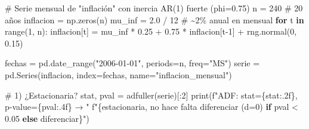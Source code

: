 \documentclass[
  spanish,
  letterpaper,
  DIV=11,
  numbers=noendperiod]{scrreprt}
\newenvironment{Shaded}{\begin{snugshade}}{\end{snugshade}}
\newcommand{\BuiltInTok}[1]{\textcolor[rgb]{0.00,0.23,0.31}{#1}}
\newcommand{\CommentTok}[1]{\textcolor[rgb]{0.37,0.37,0.37}{#1}}
\newcommand{\ControlFlowTok}[1]{\textcolor[rgb]{0.00,0.23,0.31}{\textbf{#1}}}
\newcommand{\DecValTok}[1]{\textcolor[rgb]{0.68,0.00,0.00}{#1}}
\newcommand{\FloatTok}[1]{\textcolor[rgb]{0.68,0.00,0.00}{#1}}
\newcommand{\KeywordTok}[1]{\textcolor[rgb]{0.00,0.23,0.31}{\textbf{#1}}}
\newcommand{\NormalTok}[1]{\textcolor[rgb]{0.00,0.23,0.31}{#1}}
\newcommand{\OperatorTok}[1]{\textcolor[rgb]{0.37,0.37,0.37}{#1}}
\newcommand{\SpecialCharTok}[1]{\textcolor[rgb]{0.37,0.37,0.37}{#1}}
\newcommand{\SpecialStringTok}[1]{\textcolor[rgb]{0.13,0.47,0.30}{#1}}
\newcommand{\StringTok}[1]{\textcolor[rgb]{0.13,0.47,0.30}{#1}}
\begin{document}
\label{arima-ajuste}
\begin{Shaded}
\begin{Highlighting}[]
\CommentTok{\# Serie mensual de "inflación" con inercia AR(1) fuerte (phi=0.75)}
\NormalTok{n }\OperatorTok{=} \DecValTok{240}   \CommentTok{\# 20 años}
\NormalTok{inflacion }\OperatorTok{=}\NormalTok{ np.zeros(n)}
\NormalTok{mu\_inf }\OperatorTok{=} \FloatTok{2.0} \OperatorTok{/} \DecValTok{12}  \CommentTok{\# \textasciitilde{}2\% anual en mensual}
\ControlFlowTok{for}\NormalTok{ t }\KeywordTok{in} \BuiltInTok{range}\NormalTok{(}\DecValTok{1}\NormalTok{, n):}
\NormalTok{    inflacion[t] }\OperatorTok{=}\NormalTok{ mu\_inf }\OperatorTok{*} \FloatTok{0.25} \OperatorTok{+} \FloatTok{0.75} \OperatorTok{*}\NormalTok{ inflacion[t}\OperatorTok{{-}}\DecValTok{1}\NormalTok{] }\OperatorTok{+}\NormalTok{ rng.normal(}\DecValTok{0}\NormalTok{, }\FloatTok{0.15}\NormalTok{)}

\NormalTok{fechas }\OperatorTok{=}\NormalTok{ pd.date\_range(}\StringTok{"2006{-}01{-}01"}\NormalTok{, periods}\OperatorTok{=}\NormalTok{n, freq}\OperatorTok{=}\StringTok{"MS"}\NormalTok{)}
\NormalTok{serie }\OperatorTok{=}\NormalTok{ pd.Series(inflacion, index}\OperatorTok{=}\NormalTok{fechas, name}\OperatorTok{=}\StringTok{"inflacion\_mensual"}\NormalTok{)}

\CommentTok{\# 1) ¿Estacionaria?}
\NormalTok{stat, pval }\OperatorTok{=}\NormalTok{ adfuller(serie)[:}\DecValTok{2}\NormalTok{]}
\BuiltInTok{print}\NormalTok{(}\SpecialStringTok{f"ADF: stat=}\SpecialCharTok{\{}\NormalTok{stat}\SpecialCharTok{:.2f\}}\SpecialStringTok{, p{-}value=}\SpecialCharTok{\{}\NormalTok{pval}\SpecialCharTok{:.4f\}}\SpecialStringTok{ → "}
      \SpecialStringTok{f"}\SpecialCharTok{\{}\StringTok{\textquotesingle{}estacionaria, no hace falta diferenciar (d=0)\textquotesingle{}} \ControlFlowTok{if}\NormalTok{ pval }\OperatorTok{\textless{}} \FloatTok{0.05} \ControlFlowTok{else} \StringTok{\textquotesingle{}diferenciar\textquotesingle{}}\SpecialCharTok{\}}\SpecialStringTok{"}\NormalTok{)}


\end{Highlighting}
\end{Shaded}
\end{document}

